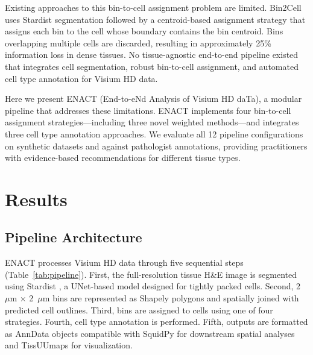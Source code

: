 \documentclass[11pt]{article}
\begin{document}
Existing approaches to this bin-to-cell assignment problem are limited. Bin2Cell \citep{dominguez2023bin2cell} uses Stardist segmentation \citep{schmidt2018stardist} followed by a centroid-based assignment strategy that assigns each bin to the cell whose boundary contains the bin centroid. Bins overlapping multiple cells are discarded, resulting in approximately 25\% information loss in dense tissues. No tissue-agnostic end-to-end pipeline existed that integrates cell segmentation, robust bin-to-cell assignment, and automated cell type annotation for Visium HD data.

Here we present ENACT (End-to-eNd Analysis of Visium HD daTa), a modular pipeline that addresses these limitations. ENACT implements four bin-to-cell assignment strategies---including three novel weighted methods---and integrates three cell type annotation approaches. We evaluate all 12 pipeline configurations on synthetic datasets and against pathologist annotations, providing practitioners with evidence-based recommendations for different tissue types.

\section{Results}

\subsection{Pipeline Architecture}

ENACT processes Visium HD data through five sequential steps (Table~\ref{tab:pipeline}). First, the full-resolution tissue H\&E image is segmented using Stardist \citep{schmidt2018stardist, weigert2020stardist}, a UNet-based model designed for tightly packed cells. Second, 2~$\mu$m $\times$ 2~$\mu$m bins are represented as Shapely polygons \citep{shapely2023} and spatially joined with predicted cell outlines. Third, bins are assigned to cells using one of four strategies. Fourth, cell type annotation is performed. Fifth, outputs are formatted as AnnData objects \citep{virshup2023anndata} compatible with SquidPy \citep{palla2022squidpy} for downstream spatial analyses and TissUUmaps \citep{franzentissUUmaps2020} for visualization.
\end{document}
